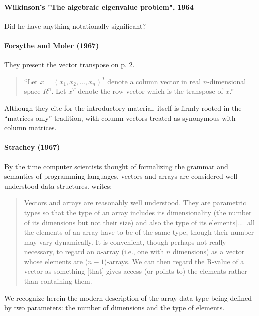 \paragraph{Wilkinson's "The algebraic eigenvalue problem", 1964}

Did he have anything notationally significant?



\paragraph{Forsythe and Moler (1967)~\cite{Forsythe1967}}

They present the vector transpose on p. 2.
\begin{quote}
``Let $x = (x_1, x_2, \dots, x_n)^T$ denote a column vector in real $n$-dimensional space $R^n$. Let $x^T$ denote the row vector which is the transpose of $x$.''~\cite[p. 2]{Forsythe1967}
\end{quote}

Although they cite \cite{Faddeev1959} for the introductory material, \cite{Faddeev1959} itself is firmly rooted in the ``matrices only'' tradition, with column vectors treated as synonymous with column matrices.



\paragraph{Strachey (1967)~\cite{Strachey1967}}

By the time computer scientists thought of formalizing the grammar and semantics of programming languages,
vectors and arrays are considered well-understood data structures. \cite[\S 3.7.7, pp. 43--44]{Strachey1967} writes:
\begin{quote}
Vectors and arrays are reasonably well understood. They are parametric types so that the type of an array includes its dimensionality (the number of
its dimensions but not their size) and also the type of its elements[...]
all the elements of an array have to be of the same type, though their number may vary dynamically.
It is convenient, though perhaps not really necessary, to regard an $n$-array
(i.e., one with $n$ dimensions) as a vector whose elements are ($n-1$)-arrays.
We can then regard the R-value of a vector as something [that] gives access (or points to) the elements rather than containing them.
\end{quote}
We recognize herein the modern description of the array data type being defined by
two parameters: the number of dimensions and the type of elements.


